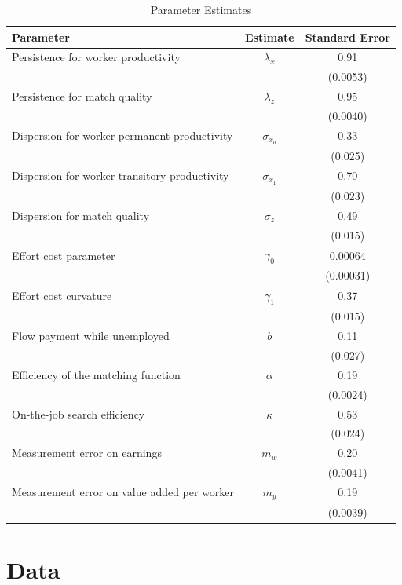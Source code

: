 \documentclass{article}
\begin{document}
\begin{table}[ht]
\centering
\caption{Parameter Estimates}
\begin{tabular}{@{}lcc@{}}
\toprule
\textbf{Parameter} & \textbf{Estimate} & \textbf{Standard Error} \\
\midrule
Persistence for worker productivity & \(\lambda_x\) & 0.91 \\
& & (0.0053) \\
Persistence for match quality & \(\lambda_z\) & 0.95 \\
& & (0.0040) \\
Dispersion for worker permanent productivity & \(\sigma_{x_0}\) & 0.33 \\
& & (0.025) \\
Dispersion for worker transitory productivity & \(\sigma_{x_1}\) & 0.70 \\
& & (0.023) \\
Dispersion for match quality & \(\sigma_z\) & 0.49 \\
& & (0.015) \\
Effort cost parameter & \(\gamma_0\) & 0.00064 \\
& & (0.00031) \\
Effort cost curvature & \(\gamma_1\) & 0.37 \\
& & (0.015) \\
Flow payment while unemployed & \(b\) & 0.11 \\
& & (0.027) \\
Efficiency of the matching function & \(\alpha\) & 0.19 \\
& & (0.0024) \\
On-the-job search efficiency & \(\kappa\) & 0.53 \\
& & (0.024) \\
Measurement error on earnings & \(m_w\) & 0.20 \\
& & (0.0041) \\
Measurement error on value added per worker & \(m_y\) & 0.19 \\
& & (0.0039) \\
\bottomrule
\end{tabular}
\label{tab:parameters}
\end{table}


\section{Data}
\end{document}
